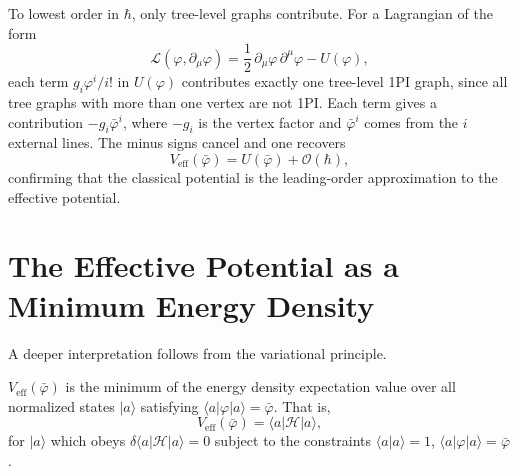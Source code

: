 To lowest order in $\hbar$, only tree-level graphs contribute. For a
Lagrangian of the form
\begin{equation}
	\mathcal{L}(\varphi, \partial_\mu \varphi) = \frac{1}{2}\,\partial_\mu
	\varphi\, \partial^\mu \varphi - U(\varphi),
\end{equation}
each term $g_i\varphi^i/i!$ in $U(\varphi)$ contributes exactly one
tree-level 1PI graph, since all tree graphs with more than one vertex are
not 1PI. Each term gives a contribution $-g_i\bar\varphi^i$, where $-g_i$
is the vertex factor and $\bar\varphi^i$ comes from the $i$ external
lines. The minus signs cancel and one recovers
\begin{equation}
	V_{\text{eff}}(\bar{\varphi}) = U(\bar{\varphi}) + \mathcal{O}(\hbar),
\end{equation}
confirming that the classical potential is the leading-order approximation
to the effective potential.

\section{The Effective Potential as a Minimum Energy Density}

A deeper interpretation follows from the variational principle.

\begin{theorem}
	$V_{\mathrm{eff}}(\bar{\varphi})$ is the minimum of the energy density
	expectation value over all normalized states $|a\rangle$ satisfying
	$\langle a|\varphi|a\rangle = \bar{\varphi}$. That is,
	\begin{equation}
		V_{\text{eff}}(\bar{\varphi}) = \langle a|\mathcal{H}|a\rangle,
	\end{equation}
	for $|a\rangle$ which obeys $\delta\langle a|\mathcal{H}|a\rangle = 0$
	subject to the constraints $\langle a|a\rangle = 1$,
	$\langle a|\varphi|a\rangle = \bar{\varphi}$.
\end{theorem}

